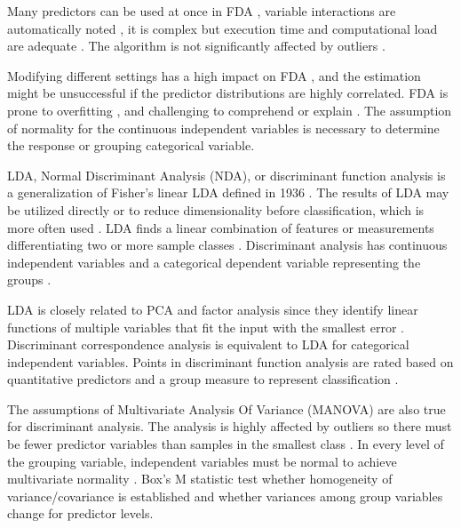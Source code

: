\documentclass[sn-mathphys-num]{sn-jnl}%
\begin{document}
Many predictors can be used at once in FDA \cite{HastieTibshirani2009}, variable interactions are automatically noted \cite{hastie1994flexible}, it is complex but execution time and computational load are adequate \cite{reynes2006choice}. The algorithm is not significantly affected by outliers \cite{phillips2017applying}.

Modifying different settings has a high impact on FDA \cite{hallgren2019species}, and the estimation might be unsuccessful if the predictor distributions are highly correlated. FDA is prone to overfitting \cite{thuiller2016ensemble}, and challenging to comprehend or explain \cite{quillfeldt2017influence}. The assumption of normality for the continuous independent variables is necessary \cite{zhang2019using} to determine the response or grouping categorical variable. 

LDA, Normal Discriminant Analysis (NDA), or discriminant function analysis is a generalization of Fisher's linear LDA defined in 1936 \cite{cohen2013applied}. The results of LDA may be utilized directly or to reduce dimensionality before classification, which is more often used \cite{hansen2005using}. LDA finds a linear combination of features or measurements differentiating two or more sample classes \cite{fisher1936use, mclachlan2005discriminant}. Discriminant analysis has continuous independent variables and a categorical dependent variable representing the groups \cite{wetcher2011analyzing}.

LDA is closely related to PCA and factor analysis since they identify linear functions of multiple variables that fit the input with the smallest error \cite{martinez2001pca}. Discriminant correspondence analysis \cite{abdi2007discriminant, perriere2003use} is equivalent to LDA for categorical independent variables. Points in discriminant function analysis are rated based on quantitative predictors and a group measure \cite{cokluk2008discriminant} to represent classification \cite{venables2013modern}.

The assumptions of Multivariate Analysis Of Variance (MANOVA) are also true for discriminant analysis. The analysis is highly affected by outliers so there must be fewer predictor variables than samples in the smallest class \cite{cokluk2008discriminant}. In every level of the grouping variable, independent variables must be normal to achieve multivariate normality \cite{cokluk2008discriminant, hansen2005using}. Box's M statistic \cite{hansen2005using} test whether homogeneity of variance/covariance is established and whether variances among group variables change for predictor levels. 
\end{document}
